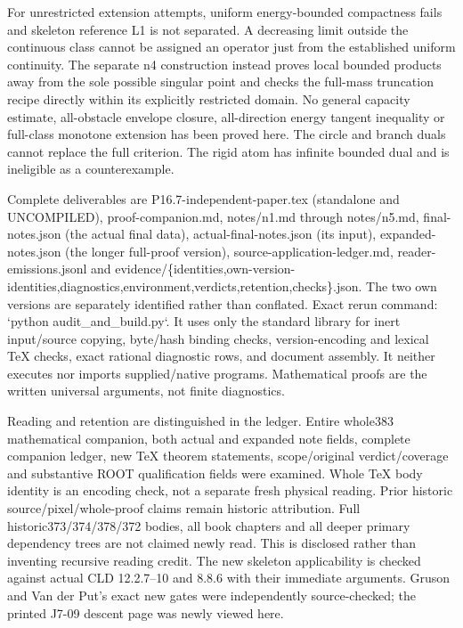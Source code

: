 \documentclass[11pt]{article}
\begin{document}
For unrestricted extension attempts, uniform energy-bounded compactness fails and skeleton reference L1 is not separated. A decreasing limit outside the continuous class cannot be assigned an operator just from the established uniform continuity. The separate n4 construction instead proves local bounded products away from the sole possible singular point and checks the full-mass truncation recipe directly within its explicitly restricted domain. No general capacity estimate, all-obstacle envelope closure, all-direction energy tangent inequality or full-class monotone extension has been proved here. The circle and branch duals cannot replace the full criterion. The rigid atom has infinite bounded dual and is ineligible as a counterexample.

Complete deliverables are P16.7-independent-paper.tex (standalone and UNCOMPILED), proof-companion.md, notes/n1.md through notes/n5.md, final-notes.json (the actual final data), actual-final-notes.json (its input), expanded-notes.json (the longer full-proof version), source-application-ledger.md, reader-emissions.jsonl and evidence/\{identities,own-version-identities,diagnostics,environment,verdicts,retention,checks\}.json. The two own versions are separately identified rather than conflated. Exact rerun command: `python audit\_and\_build.py`. It uses only the standard library for inert input/source copying, byte/hash binding checks, version-encoding and lexical TeX checks, exact rational diagnostic rows, and document assembly. It neither executes nor imports supplied/native programs. Mathematical proofs are the written universal arguments, not finite diagnostics.

Reading and retention are distinguished in the ledger. Entire whole383 mathematical companion, both actual and expanded note fields, complete companion ledger, new TeX theorem statements, scope/original verdict/coverage and substantive ROOT qualification fields were examined. Whole TeX body identity is an encoding check, not a separate fresh physical reading. Prior historic source/pixel/whole-proof claims remain historic attribution. Full historic373/374/378/372 bodies, all book chapters and all deeper primary dependency trees are not claimed newly read. This is disclosed rather than inventing recursive reading credit. The new skeleton applicability is checked against actual CLD 12.2.7--10 and 8.8.6 with their immediate arguments. Gruson and Van der Put's exact new gates were independently source-checked; the printed J7-09 descent page was newly viewed here.
\end{document}
